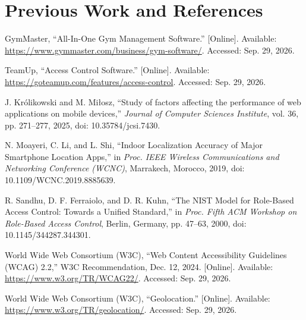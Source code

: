 \documentclass[11pt,letterpaper]{article}
\begin{document}
\section{Previous Work and References}

\begingroup\sloppy
\begin{enumerate}[label={[\arabic*]},leftmargin=2.2em,itemsep=6pt]

\item GymMaster, ``All-In-One Gym Management Software.'' [Online]. Available: \url{https://www.gymmaster.com/business/gym-software/}. Accessed: Sep. 29, 2026.

\item TeamUp, ``Access Control Software.'' [Online]. Available: \url{https://goteamup.com/features/access-control}. Accessed: Sep. 29, 2026.

\item J. Królikowski and M. Miłosz, ``Study of factors affecting the performance of web applications on mobile devices,'' \textit{Journal of Computer Sciences Institute}, vol. 36, pp. 271--277, 2025, doi: 10.35784/jcsi.7430.

\item N. Moayeri, C. Li, and L. Shi, ``Indoor Localization Accuracy of Major Smartphone Location Apps,'' in \textit{Proc. IEEE Wireless Communications and Networking Conference (WCNC)}, Marrakech, Morocco, 2019, doi: 10.1109/WCNC.2019.8885639.

\item R. Sandhu, D. F. Ferraiolo, and D. R. Kuhn, ``The NIST Model for Role-Based Access Control: Towards a Unified Standard,'' in \textit{Proc. Fifth ACM Workshop on Role-Based Access Control}, Berlin, Germany, pp. 47--63, 2000, doi: 10.1145/344287.344301.

\item World Wide Web Consortium (W3C), ``Web Content Accessibility Guidelines (WCAG) 2.2,'' W3C Recommendation, Dec. 12, 2024. [Online]. Available: \url{https://www.w3.org/TR/WCAG22/}. Accessed: Sep. 29, 2026.

\item World Wide Web Consortium (W3C), ``Geolocation.'' [Online]. Available: \url{https://www.w3.org/TR/geolocation/}. Accessed: Sep. 29, 2026.

\end{enumerate}
\endgroup
\end{document}
